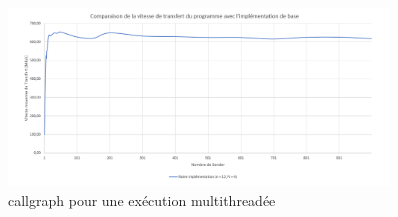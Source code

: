 \documentclass[../main.tex]{subfiles}
\begin{document}
\begin{figure}[H]
    \includegraphics[width=0.9\textwidth]{assets/test_max.PNG}
    \caption{callgraph pour une exécution multithreadée}
    \label{sec:plot_max}
\end{figure}
\end{document}
